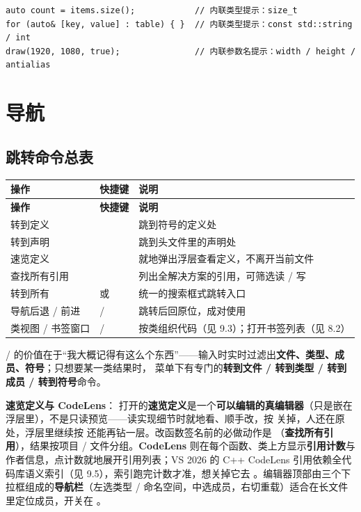 \begin{lstlisting}[style=cppstyle]
auto count = items.size();            // 内联类型提示：size_t
for (auto& [key, value] : table) { }  // 内联类型提示：const std::string / int
draw(1920, 1080, true);               // 内联参数名提示：width / height / antialias
\end{lstlisting}
\section{导航}

\subsection{跳转命令总表}

\begin{longtable}{L{3.0cm}L{3.4cm}L{8.2cm}}\toprule
\textbf{操作} & \textbf{快捷键} & \textbf{说明} \\ \midrule \endfirsthead
\toprule \textbf{操作} & \textbf{快捷键} & \textbf{说明} \\ \midrule \endhead \bottomrule \endlastfoot
转到定义 &  & 跳到符号的定义处 \\
转到声明 &  & 跳到头文件里的声明处 \\
速览定义 &  & 就地弹出浮层查看定义，不离开当前文件 \\
查找所有引用 &  & 列出全解决方案的引用，可筛选读 / 写 \\
转到所有 &  或  & 统一的搜索框式跳转入口 \\
导航后退 / 前进 &  /  & 跳转后回原位，成对使用 \\
类视图 / 书签窗口 &  /  & 按类组织代码（见 9.3）；打开书签列表（见 8.2） \\
\end{longtable}
 /  的价值在于“我大概记得有这么个东西”——输入时实时过滤出\textbf{文件、类型、成员、符号}；只想要某一类结果时， 菜单下有专门的\textbf{转到文件 / 转到类型 / 转到成员 / 转到符号}命令。

\textbf{速览定义与 CodeLens}： 打开的\textbf{速览定义}是一个\textbf{可以编辑的真编辑器}（只是嵌在浮层里），不是只读预览——读实现细节时就地看、顺手改，按  关掉，人还在原处，浮层里继续按  还能再钻一层。改函数签名前的必做动作是 （\textbf{查找所有引用}），结果按项目 / 文件分组。\textbf{CodeLens} 则在每个函数、类上方显示\textbf{引用计数}与作者信息，点计数就地展开引用列表；VS 2026 的 C++ CodeLens 引用依赖全代码库语义索引（见 9.5），索引跑完计数才准，想关掉它去 。编辑器顶部由三个下拉框组成的\textbf{导航栏}（左选类型 / 命名空间，中选成员，右切重载）适合在长文件里定位成员，开关在 。

